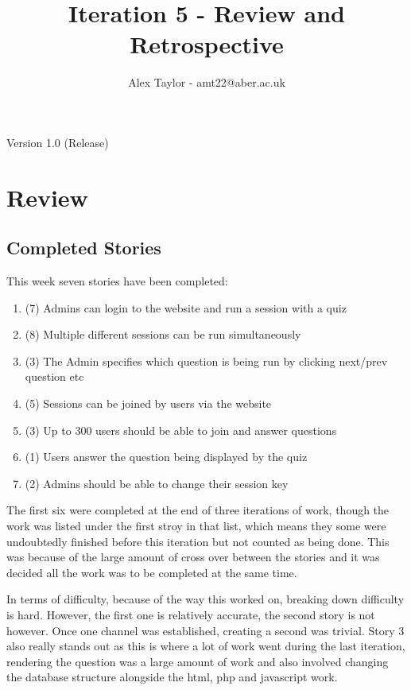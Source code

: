\documentclass{article}
\title{Iteration 5 - Review and Retrospective}
\author{Alex Taylor - amt22@aber.ac.uk}
\begin{document}
\maketitle
\begin{center}
	Version 1.0 (Release)
\end{center}
\tableofcontents
\thispagestyle{empty}
\newpage

\section{Review}
\subsection{Completed Stories}
This week seven stories have been completed:
\begin{enumerate}
	\item (7) Admins can login to the website and run a session with a quiz
	\item (8) Multiple different sessions can be run simultaneously
	\item (3) The Admin specifies which question is being run by clicking next/prev question etc
	\item (5) Sessions can be joined by users via the website
	\item (3) Up to 300 users should be able to join and answer questions
	\item (1) Users answer the question being displayed by the quiz
	\item (2) Admins should be able to change their session key
\end{enumerate}
The first six were completed at the end of three iterations of work, though the work was listed under the first stroy in that list, which means they some were undoubtedly finished before this iteration but not counted as being done. This was because of the large amount of cross over between the stories and it was decided all the work was to be completed at the same time.

In terms of difficulty, because of the way this worked on, breaking down difficulty is hard. However, the first one is relatively accurate, the second story  is not however. Once one channel was established, creating a second was trivial. Story 3 also really stands out as this is where a lot of work went during the last iteration, rendering the question was a large amount of work and also involved changing the database structure alongside the html, php and javascript work. 
\end{document}
